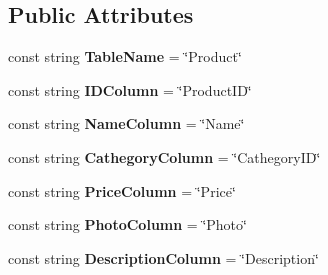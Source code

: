 \subsection*{Public Attributes}
\begin{DoxyCompactItemize}
\item 
\mbox{\label{class_eshop_1_1_product_a9c6616d72c69886335a3c59cb4ba2e86}} 
const string {\bfseries Table\+Name} = \char`\"{}Product\char`\"{}
\item 
\mbox{\label{class_eshop_1_1_product_a578666ccbf58dd071a856a8fdddeea9a}} 
const string {\bfseries I\+D\+Column} = \char`\"{}Product\+ID\char`\"{}
\item 
\mbox{\label{class_eshop_1_1_product_a366bb4af9ff2d522af69647d3ec2ca77}} 
const string {\bfseries Name\+Column} = \char`\"{}Name\char`\"{}
\item 
\mbox{\label{class_eshop_1_1_product_a0f6341a85cb70b6f1a0fa0475f5e4feb}} 
const string {\bfseries Cathegory\+Column} = \char`\"{}Cathegory\+ID\char`\"{}
\item 
\mbox{\label{class_eshop_1_1_product_a9ec1c9894d63af31620aa0f14b41a76d}} 
const string {\bfseries Price\+Column} = \char`\"{}Price\char`\"{}
\item 
\mbox{\label{class_eshop_1_1_product_a5ee3fe20cd25e8e3ebcd38a4d5f2e30b}} 
const string {\bfseries Photo\+Column} = \char`\"{}Photo\char`\"{}
\item 
\mbox{\label{class_eshop_1_1_product_ae377aaebc54dd7f6eb8ea60f23d76945}} 
const string {\bfseries Description\+Column} = \char`\"{}Description\char`\"{}
\end{DoxyCompactItemize}
